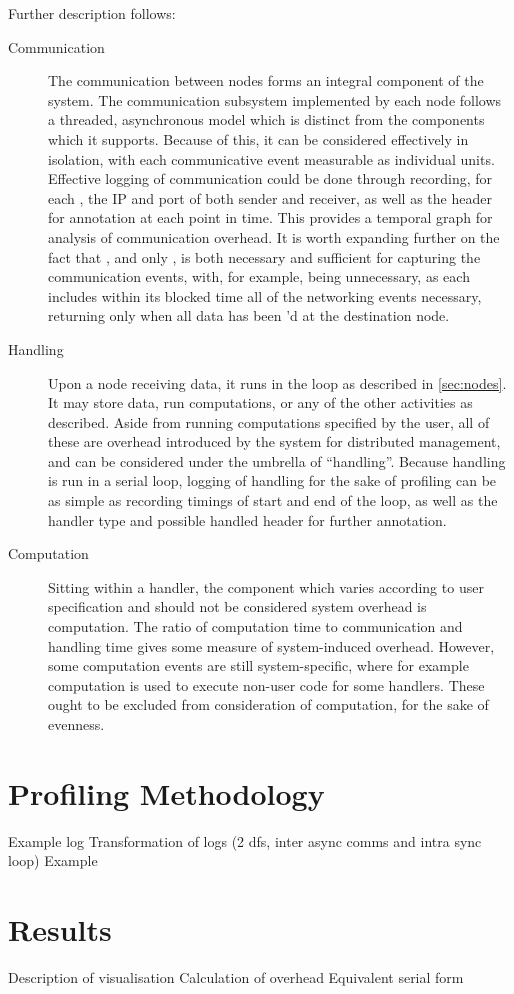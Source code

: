 Further description follows:
\begin{description}
\item [Communication] The communication between nodes forms an integral component of the \lsr system. The communication subsystem implemented by each node follows a threaded, asynchronous model which is distinct from the components which it supports. Because of this, it can be considered effectively in isolation, with each communicative event measurable as individual units. Effective logging of communication could be done through recording, for each , the IP and port of both sender and receiver, as well as the header for annotation at each point in time. This provides a temporal graph for analysis of communication overhead. It is worth expanding further on the fact that , and only , is both necessary and sufficient for capturing the communication events, with, for example,  being unnecessary, as each  includes within its blocked time all of the networking events necessary, returning only when all data has been 'd at the destination node.
\item [Handling] Upon a node receiving data, it runs in the loop as described in \cref{sec:nodes}. It may store data, run computations, or any of the other activities as described. Aside from running computations specified by the user, all of these are overhead introduced by the system for distributed management, and can be considered under the umbrella of ``handling''. Because handling is run in a serial loop, logging of handling for the sake of profiling can be as simple as recording timings of start and end of the loop, as well as the handler type and possible handled header for further annotation.
\item [Computation] Sitting within a handler, the component which varies according to user specification and should not be considered system overhead is computation. The ratio of computation time to communication and handling time gives some measure of system-induced overhead. However, some computation events are still system-specific, where for example computation is used to execute non-user code for some handlers. These ought to be excluded from consideration of computation, for the sake of evenness.
\end{description}

\section{Profiling Methodology}\label{sec:prof-methods}
Example log
Transformation of logs (2 dfs, inter async comms and intra sync loop)
Example

\section{Results}\label{sec:prof-results}
Description of visualisation
Calculation of overhead
Equivalent serial form
